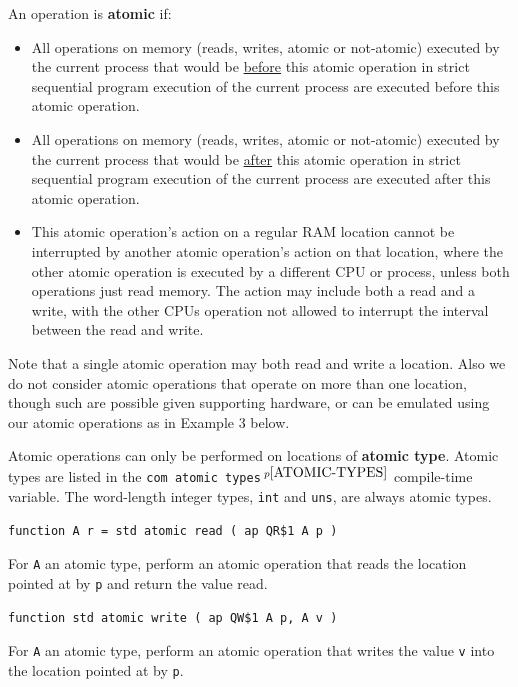 \documentclass[12pt]{article}
\newcommand{\key}[1]{{\rm \bfseries #1}}
\newcommand{\pagnote}[1]{$\,^{p\pageref{#1}}$}
\newenvironment{indpar}[1][0.3in]%
	{\begin{list}{}%
		     {\setlength{\itemsep}{0in}%
		      \setlength{\topsep}{0in}%
		      \setlength{\parsep}{1ex}%
		      \setlength{\labelwidth}{#1}%
		      \setlength{\leftmargin}{#1}%
		      \addtolength{\leftmargin}{\labelsep}}%
	 \item}%
	{\end{list}}
\begin{document}
An operation is \key{atomic} if:
\begin{indpar}
\begin{itemize}
\item [(A1)]
All operations on memory (reads, writes, atomic or not-atomic)
executed by the current process that would be \underline{before}
this atomic operation in strict sequential program execution
of the current process
are executed before this atomic operation.
\item [(A2)]
All operations on memory (reads, writes, atomic or not-atomic)
executed by the current process that would be \underline{after}
this atomic operation in strict sequential program execution
of the current process
are executed after this atomic operation.
\item [(A3)]
This atomic operation's action on a regular RAM location
cannot be interrupted by another atomic operation's action on that location,
where the other atomic operation is executed by a different CPU
or process, unless both operations just read memory.
The action may include both a read and a write, with the other CPUs
operation not allowed to interrupt the interval between the read and write.
\end{itemize}
\end{indpar}

Note that a single atomic operation may both read and write a location.
Also we do not consider atomic operations that operate on more than
one location, though such are possible given supporting hardware, or can
be emulated using our atomic operations as in Example 3 below.

Atomic operations can only be performed on locations of \key{atomic type}.
Atomic types are listed in the {\tt com atomic types}\pagnote{ATOMIC-TYPES}
compile-time variable.
The word-length integer types, {\tt int} and {\tt uns}, are
always atomic types.

{\tt function A r = std atomic read ( ap QR\$1 A p )}
\begin{indpar}
For {\tt A} an atomic type,
perform an atomic operation that reads the location
pointed at by {\tt p} and return the value read.
\end{indpar}

{\tt function std atomic write ( ap QW\$1 A p, A v )}
\begin{indpar}
For {\tt A} an atomic type,
perform an atomic operation that writes the value {\tt v}
into the location pointed at by {\tt p}.
\end{indpar}
\end{document}

